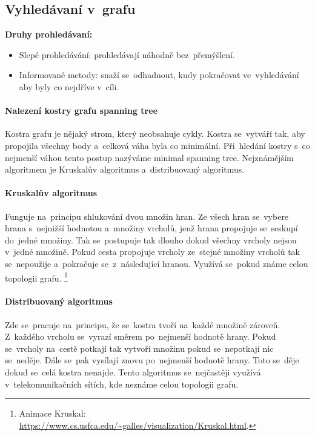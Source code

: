 \subsection{Vyhledávaní v~grafu}

\textbf{Druhy prohledávaní:}
\begin{itemize}
	\item Slepé prohledávání: prohledávají náhodně bez~přemýšlení.
	\item Informované metody: snaží se~odhadnout, kudy pokračovat ve~vyhledávání aby byly co nejdříve v~cíli.
\end{itemize}

\paragraph{Nalezení kostry grafu spanning tree} Kostra grafu je nějaký strom, který neobsahuje cykly. Kostra se~vytváří tak, aby propojila všechny body a~celková váha byla co minimální. Při~hledání kostry s~co nejmenší váhou tento postup nazýváme minimal spanning tree. Nejznámějším algoritmem je Kruskalův algoritmus a~distribuovaný algoritmus.

\paragraph{Kruskalův algoritmus} Funguje na~principu shlukování dvou množin hran. Ze všech hran se~vybere hrana s~nejnižší hodnotou a~množiny vrcholů, jenž hrana propojuje se~seskupí do~jedné množiny. Tak se~postupuje tak dlouho dokud všechny vrcholy nejsou v~jedné množině. Pokud cesta propojuje vrcholy ze~stejné množiny vrcholů tak se~nepoužije a~pokračuje se~z~následující hranou. Využívá se~pokud známe celou topologii grafu.%
\footnote{Animace Kruskal: \url{https://www.cs.usfca.edu/~galles/visualization/Kruskal.html}.}

\paragraph{Distribuovaný algoritmus} Zde se~pracuje na~principu, že se~kostra tvoří na~každé množině zároveň. Z~každého vrcholu se~vyrazí směrem po~nejmenší hodnotě hrany. Pokud se~vrcholy na~cestě potkají tak vytvoří množinu pokud se~nepotkají nic se~neděje. Dále se~pak vysílají znovu po~nejmenší hodnotě hrany. Toto se~děje dokud se~celá kostra nenajde. Tento algoritmus se~nejčastěji využívá v~telekomunikačních sítích, kde neznáme celou topologii grafu.

